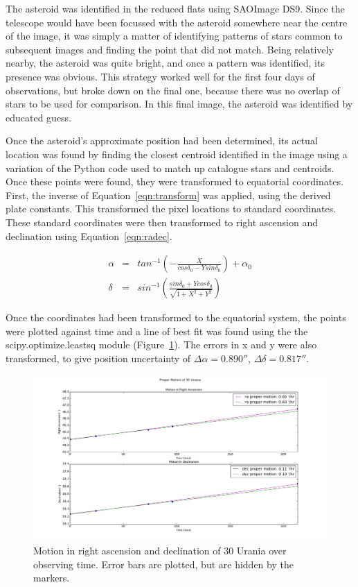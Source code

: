 \documentclass[a4paper,12pt]{article}
\begin{document}
The asteroid was identified in the reduced flats using SAOImage DS9. Since the telescope would have been focussed with the asteroid somewhere near the centre of the image, it was simply a matter of identifying patterns of stars common to subsequent images and finding the point that did not match. Being relatively nearby, the asteroid was quite bright, and once a pattern was identified, its presence was obvious. This strategy worked well for the first four days of observations, but broke down on the final one, because there was no overlap of stars to be used for comparison. In this final image, the asteroid was identified by educated guess.

Once the asteroid's approximate position had been determined, its actual location was found by finding the closest centroid identified in the image using a variation of the Python code used to match up catalogue stars and centroids. Once these points were found, they were transformed to equatorial coordinates. First, the inverse of Equation~\ref{eqn:transform} was applied, using the derived plate constants. This transformed the pixel locations to standard coordinates. These standard coordinates were then transformed to right ascension and declination using Equation~\ref{eqn:radec}.

\begin{equation}
\begin{array}{ccl}
\alpha &=& tan^{-1}\left(-\frac{X}{cos\delta_{0}-Ysin\delta_{0}}\right) + \alpha_{0}\\
\delta &=& sin^{-1}\left(\frac{sin\delta_{0} + Ycos\delta_{0}}{\sqrt{1+X^{2}+Y^{2}}}\right)
\end{array}
\label{eqn:radec}
\end{equation}

Once the coordinates had been transformed to the equatorial system, the points were plotted against time and a line of best fit was found using the the scipy.optimize.leastsq module (Figure~\ref{fig:pm}). The errors in x and y were also transformed, to give position uncertainty of $\Delta\alpha = 0.890''$, $\Delta\delta = 0.817''$.

\begin{figure}[!htbp]
\centering
\includegraphics[scale = 0.35]{proper_motion.png}
\caption{Motion in right ascension and declination of 30 Urania over observing time. Error bars are plotted, but are hidden by the markers.}
\label{fig:pm}
\end{figure}
\end{document}

